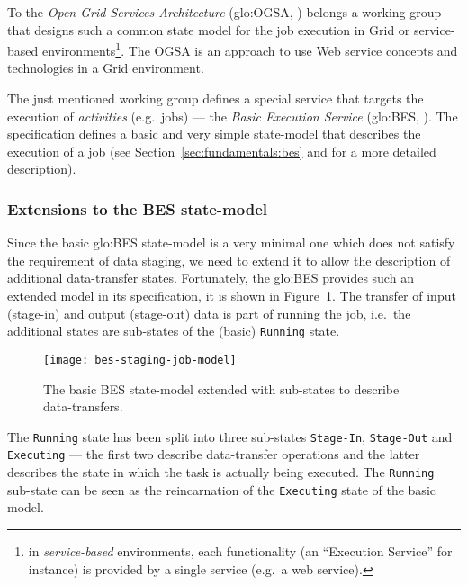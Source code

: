To   the   \emph{Open   Grid   Services   Architecture}   (\gls{glo:OGSA},
\cite{ogsa})  belongs a  working group  that designs  such a  common state
model    for    the   job    execution    in    Grid   or    service-based
environments\footnote{in     \emph{service-based}    environments,    each
  functionality (an  ``Execution Service'' for instance) is  provided by a
  single service  (e.g.~a web service).}. The  OGSA is an  approach to use
Web service concepts and technologies in a Grid environment.

The just  mentioned working group  defines a special service  that targets
the  execution  of   \emph{activities}  (e.g.~jobs)  ---  the  \emph{Basic
  Execution Service}  (\gls{glo:BES}, \cite{ogsa-bes}).  The specification
defines a basic  and very simple state-model that  describes the execution
of a job (see Section~\ref{sec:fundamentals:bes} and \cite{ogsa-bes} for a
more detailed description).

\subsubsection{Extensions to the BES state-model}

Since the basic \gls{glo:BES} state-model is a very minimal one which does
not satisfy the requirement of data staging, we need to extend it to allow
the  description  of additional  data-transfer  states.  Fortunately,  the
\gls{glo:BES} provides such an extended  model in its specification, it is
shown in  Figure~\ref{fig:bes-extended}. The transfer  of input (stage-in)
and  output  (stage-out)  data  is  part  of  running  the  job,  i.e.~the
additional states are sub-states of the (basic) \texttt{Running} state.

\begin{figure}
  \centering
  \texttt{[image: bes-staging-job-model]}
  \caption[BES State Model Staging Extension]{The basic BES state-model
    extended with sub-states to describe data-transfers.}
  \label{fig:bes-extended}
\end{figure}

The  \texttt{Running}   state  has   been  split  into   three  sub-states
\texttt{Stage-In}, \texttt{Stage-Out} and \texttt{Executing} --- the first
two describe  data-transfer operations and the latter  describes the state
in  which  the task  is  actually  being  executed.  The  \texttt{Running}
sub-state can be seen as the reincarnation of the \texttt{Executing} state
of the  basic model.

